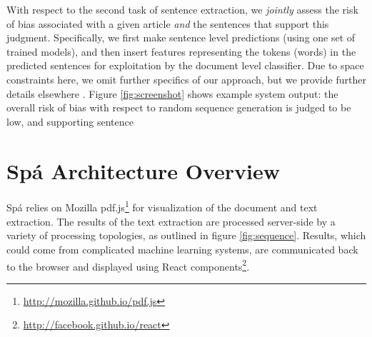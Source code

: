 \documentclass[runningheads,a4paper]{llncs}
\begin{document}
With respect to the second task of sentence extraction, we \emph{jointly} assess the risk of bias associated with a given article \emph{and} the sentences that support this judgment.
Specifically, we first make sentence level predictions (using one set of trained models), and then insert features representing the tokens (words) in the predicted sentences for exploitation by the document level classifier.
Due to space constraints here, we omit further specifics of our approach, but we provide further details elsewhere \cite{marshall2014}.
Figure \ref{fig:screenshot} shows example system output: the overall risk of bias with respect to random sequence generation is judged to be low, and supporting sentence



\section{Spá Architecture Overview}
Spá relies on Mozilla pdf.js\footnote{\url{http://mozilla.github.io/pdf.js}} for visualization of the document and text extraction.
The results of the text extraction are processed server-side by a variety of processing topologies, as outlined in figure \ref{fig:sequence}.
Results, which could come from complicated machine learning systems, are communicated back to the browser and displayed using React components\footnote{\url{http://facebook.github.io/react}}.
\end{document}
